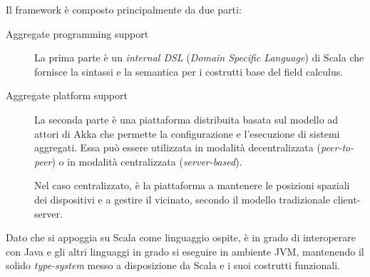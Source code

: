 Il framework è composto principalmente da due parti:

\begin{description}
  \item[Aggregate programming support]
    La prima parte è un \emph{internal DSL} (\emph{Domain Specific Language}) di Scala che fornisce la sintassi e la semantica per i costrutti base del field calculus.

  \item[Aggregate platform support]
    La seconda parte è una piattaforma distribuita basata sul modello ad attori di Akka che permette la configurazione e l'esecuzione di sistemi aggregati.
    Essa può essere utilizzata in modalità decentralizzata (\emph{peer-to-peer}) %
    o in modalità centralizzata (\emph{server-based}).%



    Nel caso centralizzato, è la piattaforma a mantenere le posizioni spaziali dei dispositivi e a gestire il vicinato, secondo il modello tradizionale client-server.
\end{description}

Dato che si appoggia su Scala come linguaggio ospite, è in grado di interoperare con Java e gli altri linguaggi in grado si eseguire in ambiente JVM, mantenendo il solido \emph{type-system} messo a disposizione da Scala e i suoi costrutti funzionali.
